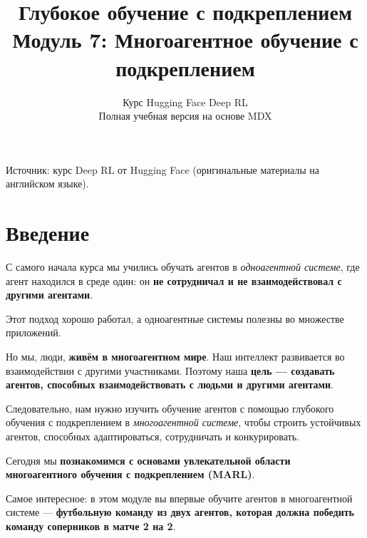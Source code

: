 \documentclass[11pt,a4paper]{article}
\title{\textbf{Глубокое обучение с подкреплением}\\[0.35em]\large Модуль 7: Многоагентное обучение с подкреплением}
\author{Курс Hugging Face Deep RL\\\small Полная учебная версия на основе MDX}
\date{}
\begin{document}
\selectfont
\maketitle
\vspace{-0.8em}
\begin{center}\small\color{secondary}Источник: курс Deep RL от Hugging Face (оригинальные материалы на английском языке).\end{center}
\begingroup\small\setlength{\parskip}{0pt}\tableofcontents\endgroup
\vspace{0.5em}
\clearpage

\section{Введение}\label{introduction}


С самого начала курса мы учились обучать агентов в \emph{одноагентной системе}, где агент находился в среде один: он \textbf{не сотрудничал и не взаимодействовал с другими агентами}.

Этот подход хорошо работал, а одноагентные системы полезны во множестве приложений.


Но мы, люди, \textbf{живём в многоагентном мире}. Наш интеллект развивается во взаимодействии с другими участниками. Поэтому наша \textbf{цель --- создавать агентов, способных взаимодействовать с людьми и другими агентами}.

Следовательно, нам нужно изучить обучение агентов с помощью глубокого обучения с подкреплением в \emph{многоагентной системе}, чтобы строить устойчивых агентов, способных адаптироваться, сотрудничать и конкурировать.

Сегодня мы \textbf{познакомимся с основами увлекательной области многоагентного обучения с подкреплением (MARL)}.

Самое интересное: в этом модуле вы впервые обучите агентов в многоагентной системе --- \textbf{футбольную команду из двух агентов, которая должна победить команду соперников в матче 2 на 2}.
\end{document}
